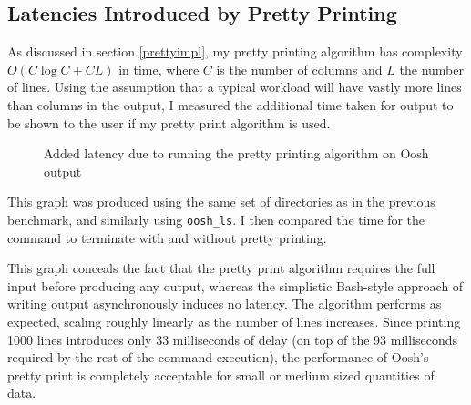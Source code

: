 \documentclass[12pt,twoside,notitlepage]{report}
\begin{document}
\subsection{Latencies Introduced by Pretty Printing}
\label{prettyspeed}
As discussed in section \ref{prettyimpl}, my pretty printing algorithm
has complexity $O(C \log C + CL)$ in time, where $C$ is the number of
columns and $L$ the number of lines. Using the assumption that a
typical workload will have vastly more lines than columns in the
output, I measured the additional time taken for output to be shown to
the user if my pretty print algorithm is used.

\begin{figure}[h]
  \centering
  \setlength\fboxsep{2pt}
  \setlength\fboxrule{0.5pt}
  \caption{Added latency due to running the pretty printing algorithm on
    Oosh output}
\end{figure}

This graph was produced using the same set of directories as in the
previous benchmark, and similarly using {\tt oosh\_ls}. I then
compared the time for the command to terminate with and without pretty
printing.

This graph conceals the fact that the pretty print algorithm requires
the full input before producing any output, whereas the simplistic
Bash-style approach of writing output asynchronously induces no
latency. The algorithm performs as expected, scaling roughly linearly
as the number of lines increases. Since printing 1000 lines introduces
only 33 milliseconds of delay (on top of the 93 milliseconds required
by the rest of the command execution), the performance of Oosh's
pretty print is completely acceptable for small or medium sized
quantities of data.
\end{document}
